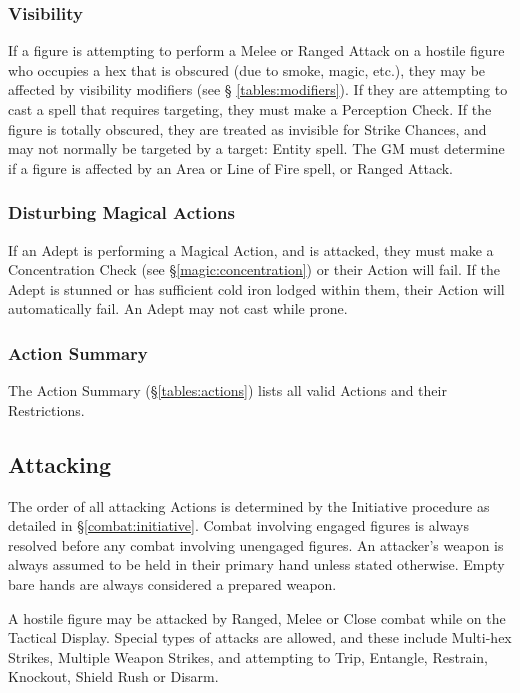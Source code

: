 \begin{multicols*}{3}
\subsubsection{Visibility}

If a figure is attempting to perform a Melee or Ranged Attack on a
hostile figure who occupies a hex that is obscured (due to smoke,
magic, etc.), they may be affected by visibility modifiers (see \S
\ref{tables:modifiers}). If they are attempting to cast a spell that
requires targeting, they must make a Perception Check. If the figure
is totally obscured, they are treated as invisible for Strike Chances,
and may not normally be targeted by a target: Entity spell. The GM
must determine if a figure is affected by an Area or Line of Fire
spell, or Ranged Attack.

\subsubsection{Disturbing Magical Actions}

If an Adept is performing a Magical Action, and is attacked, they must
make a Concentration Check (see \S \ref{magic:concentration}) or their
Action will fail. If the Adept is stunned or has sufficient cold iron
lodged within them, their Action will automatically fail. An Adept may
not cast while prone.

\subsubsection{Action Summary}

The Action Summary (\S \ref{tables:actions}) lists all valid Actions
and their Restrictions.

\subsection{Attacking}
\label{combat:attacking}

The order of all attacking Actions is determined by the Initiative
procedure as detailed in \S \ref{combat:initiative}. Combat involving
engaged figures is always resolved before any combat involving
unengaged figures. An attacker's weapon is always assumed to be held
in their primary hand unless stated otherwise. Empty bare hands are
always considered a prepared weapon.

A hostile figure may be attacked by Ranged, Melee or Close combat
while on the Tactical Display. Special types of attacks are allowed,
and these include Multi-hex Strikes, Multiple Weapon Strikes, and
attempting to Trip, Entangle, Restrain, Knockout, Shield Rush or
Disarm.


\end{multicols*}
